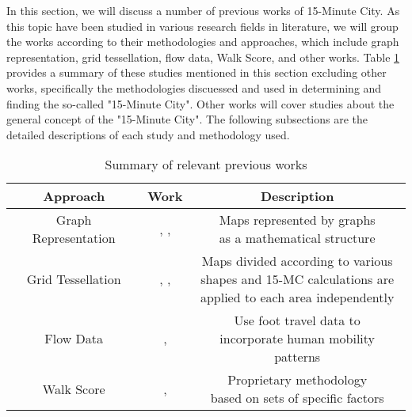 In this section, we will discuss a number of previous works of 15-Minute City. As this topic have been studied in various research fields in literature, we will group the works according to their methodologies and approaches, which include graph representation, grid tessellation, flow data, Walk Score, and other works. Table \ref{previous_works} provides a summary of these studies mentioned in this section excluding other works, specifically the methodologies discuessed and used in determining and finding the so-called "15-Minute City". Other works will cover studies about the general concept of the "15-Minute City". The following subsections are the detailed descriptions of each study and methodology used.

\begin{table}[htbp]
    \begin{center}
        \caption{Summary of relevant previous works}
        \label{previous_works}
        \begin{tabular}{ |c|c|c| }
            \hline
            \textbf{Approach} & \textbf{Work} & \textbf{Description} \\
            \hline
            \hline
            Graph Representation & \makecell{\cite{barbieri_graph_2023}, \cite{caselli_exploring_2022},\\\cite{rhoads_inclusive_2023}} & \makecell{Maps represented by graphs\\as a mathematical structure}\\
            \hline
            Grid Tessellation & \makecell{\cite{gaglione_urban_2022}, \cite{olivari_are_2023},\\\cite{Pezzica_Altafini_Mara_Chioni_2024}} & \makecell{Maps divided according to various\\shapes and 15-MC calculations are\\applied to each area independently} \\
            \hline
            Flow Data & \cite{zhang_towards_2023}, \cite{sarkar_measuring_2020} & \makecell{Use foot travel data to\\incorporate human mobility patterns} \\
            \hline
            Walk Score & \cite{walkscore}, \cite{weng_15-minute_2019} & \makecell{Proprietary methodology\\based on sets of specific factors} \\
            \hline
        \end{tabular}
    \end{center}
\end{table}

